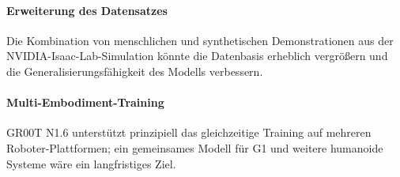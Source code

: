 \paragraph{Erweiterung des Datensatzes}
Die Kombination von menschlichen und synthetischen Demonstrationen aus der
NVIDIA-Isaac-Lab-Simulation könnte die Datenbasis erheblich vergrößern und
die Generalisierungsfähigkeit des Modells verbessern.

\paragraph{Multi-Embodiment-Training}
GR00T N1.6 unterstützt prinzipiell das gleichzeitige Training auf mehreren
Roboter-Plattformen; ein gemeinsames Modell für G1 und weitere humanoide
Systeme wäre ein langfristiges Ziel.
